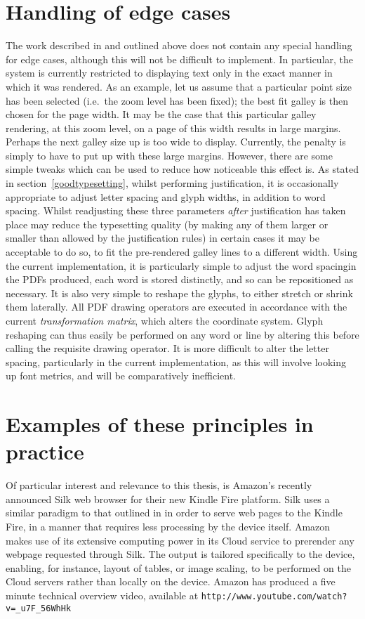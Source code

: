 \section{Handling of edge cases}
\label{edgecases}
The work described in \cite{Pinkney2011} and outlined above does not contain any special handling
for edge cases, although this will not be difficult to implement. In particular, the system is
currently restricted to displaying text only in the exact manner in which it was rendered. As an
example, let us assume that a particular point size has been selected (i.e.\ the zoom level has been
fixed); the best fit galley is then chosen for the page width. It may be the case that this
particular galley rendering, at this zoom level, on a page of this width results in large margins.
Perhaps the next galley size up is too wide to display. Currently, the penalty is simply to have to
put up with these large margins. However, there are some simple tweaks which can be used to reduce
how noticeable this effect is. As stated in section~\ref{goodtypesetting}, whilst performing
justification, it is occasionally appropriate to adjust letter spacing and glyph widths, in addition
to word spacing. Whilst readjusting these three 
parameters \emph{after} justification has taken place may reduce the typesetting quality (by making
any of them larger or smaller than allowed by the justification rules) in certain cases it may be
acceptable to do so, to fit the pre-rendered galley lines to a different width. Using the current
implementation, it is particularly simple to adjust the word spacing\ed in the PDFs produced, each
word is stored distinctly, and so can be repositioned as necessary. It is also very simple to
reshape the glyphs, to either stretch or shrink them laterally. All PDF drawing operators are
executed in accordance with the current \emph{transformation matrix}, which alters the coordinate
system\cite{Adobe2001}. Glyph reshaping can thus easily be performed on any word or line by altering
this before calling the requisite drawing operator. It is more difficult to alter the letter
spacing, particularly in the current implementation, as this will involve looking up font metrics,
and will be comparatively inefficient.


\section{Examples of these principles in practice}
Of particular interest and relevance to this thesis, is Amazon's recently announced Silk web browser
for their new Kindle Fire platform. Silk uses a similar paradigm to that outlined in
\cite{Pinkney2011} in order to serve web pages to the Kindle Fire, in a manner that requires less
processing by the device itself. Amazon makes use of its extensive computing power in its Cloud
service to prerender any webpage requested through Silk. The output is tailored specifically to the
device, enabling, for instance, layout of tables, or image scaling, to be performed on the Cloud
servers rather than locally on the device. Amazon has produced a five minute technical overview
video, available at \verb+http://www.youtube.com/watch?v=_u7F_56WhHk+


